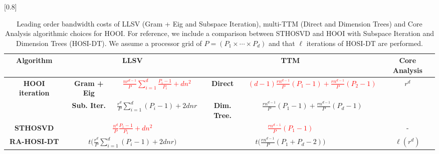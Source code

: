 \begin{table}
    \scalebox{0.62125}[0.8]{
        \begin{tabular}{c|c|c|c|c|c}
            \bf Algorithm & \multicolumn{2}{|c|}{\bf LLSV} & \multicolumn{2}{|c|}{\bf TTM} & \bf Core Analysis\\ \hline \hline
            \multirow{2}{*}{\bf HOOI iteration} & \bf Gram + Eig & \textcolor{red}{$\frac{nr^{d-1}}{P}\sum_{i=1}^{d}\frac{P_i-1}{P_i} + dn^2$} & \bf Direct & \textcolor{red}{$(d-1)\frac{rn^{d-1}}{P}(P_1 - 1) + \frac{rn^{d-1}}{P}(P_2 - 1)$} & \multirow{2}{*}{$r^d$}\\\cline{2-5}
            & \bf Sub. Iter. & $\frac{r^d}{P}\sum_{i=1}^{d} \left(P_i - 1\right) + 2dnr$ & \bf Dim. Tree. & $\frac{rn^{d-1}}{P}(P_1 - 1) + \frac{rn^{d-1}}{P}(P_d - 1)$\\\hline\hline
            \bf STHOSVD & \multicolumn{2}{|c|}{\textcolor{red}{$\frac{n^d}{P}\frac{P_1-1}{P_1} + dn^2$}} & \multicolumn{2}{|c|}{\textcolor{red}{$\frac{rn^{d-1}}{P}(P_1 - 1)$}} & -\\\hline
            \bf RA-HOSI-DT & \multicolumn{2}{|c|}{$t\Big(\frac{r^d}{P}\sum_{i=1}^{d} (P_i - 1) + 2dnr\Big)$} & \multicolumn{2}{|c|}{$t\Big(\frac{rn^{d-1}}{P}(P_1+P_d-2)\Big)$} & $\ell \left(r^d\right)$\\\hline
        \end{tabular}
    }
    \caption{Leading order bandwidth costs of LLSV (Gram + Eig and Subspace Iteration), multi-TTM (Direct and Dimension Trees) and Core Analysis algorithmic choices for HOOI. For reference, we include a comparison between STHOSVD and HOOI with Subspace Iteration and Dimension Trees (HOSI-DT). We assume a processor grid of $P = (P_1\times \cdots \times P_d)$ and that $\ell$ iterations of HOSI-DT are performed.}
    \label{tab:comm}
\end{table}
